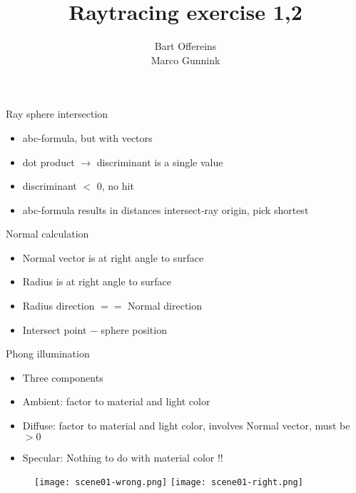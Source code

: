 \documentclass{beamer}
\author{Bart Offereins\\Marco Gunnink}
\title{Raytracing exercise 1,2}
\begin{document}
\titlepage

\begin{frame}{Ray sphere intersection}

\begin{itemize}
  \item abc-formula, but with vectors
  \item dot product $\rightarrow$ discriminant is a single value
  \item discriminant $<$ 0, no hit
  \item abc-formula results in distances intersect-ray origin, pick shortest
\end{itemize}

\end{frame}

\begin{frame}{Normal calculation}

\begin{itemize}
  \item Normal vector is at right angle to surface
  \item Radius is at right angle to surface
  \item Radius direction $==$ Normal direction 
  \item Intersect point $-$ sphere position
\end{itemize}

\end{frame}

\begin{frame}{Phong illumination}

\begin{itemize}
  \item Three components
  \item Ambient: factor to material and light color
  \item Diffuse: factor to material and light color, involves Normal vector, must be $> 0$
  \item Specular: Nothing to do with material color !!
\end{itemize}

   \begin{figure}[ht]
       \texttt{[image: scene01-wrong.png]} %
       \texttt{[image: scene01-right.png]} %
    \end{figure}

\end{frame}
\end{document}
